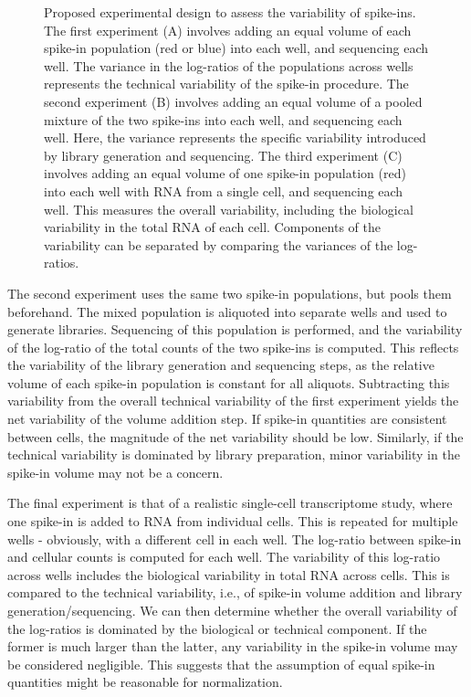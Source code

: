 \documentclass{article}
\begin{document}
\begin{figure}[H]
\begin{center}
\end{center}
\caption{Proposed experimental design to assess the variability of spike-ins.
The first experiment (A) involves adding an equal volume of each spike-in population (red or blue) into each well, and sequencing each well.
The variance in the log-ratios of the populations across wells represents the technical variability of the spike-in procedure.
The second experiment (B) involves adding an equal volume of a pooled mixture of the two spike-ins into each well, and sequencing each well.
Here, the variance represents the specific variability introduced by library generation and sequencing.
The third experiment (C) involves adding an equal volume of one spike-in population (red) into each well with RNA from a single cell, and sequencing each well.
This measures the overall variability, including the biological variability in the total RNA of each cell.
Components of the variability can be separated by comparing the variances of the log-ratios.
}
\label{fig:expdesign}
\end{figure}

The second experiment uses the same two spike-in populations, but pools them beforehand.
The mixed population is aliquoted into separate wells and used to generate libraries.
Sequencing of this population is performed, and the variability of the log-ratio of the total counts of the two spike-ins is computed.
This reflects the variability of the library generation and sequencing steps, as the relative volume of each spike-in population is constant for all aliquots.
Subtracting this variability from the overall technical variability of the first experiment yields the net variability of the volume addition step.
If spike-in quantities are consistent between cells, the magnitude of the net variability should be low.
Similarly, if the technical variability is dominated by library preparation, minor variability in the spike-in volume may not be a concern.

The final experiment is that of a realistic single-cell transcriptome study, where one spike-in is added to RNA from individual cells.
This is repeated for multiple wells - obviously, with a different cell in each well.
The log-ratio between spike-in and cellular counts is computed for each well.
The variability of this log-ratio across wells includes the biological variability in total RNA across cells.
This is compared to the technical variability, i.e., of spike-in volume addition and library generation/sequencing.
We can then determine whether the overall variability of the log-ratios is dominated by the biological or technical component.
If the former is much larger than the latter, any variability in the spike-in volume may be considered negligible.
This suggests that the assumption of equal spike-in quantities might be reasonable for normalization.
\end{document}
